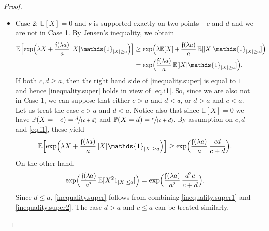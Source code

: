 \documentclass[JEP,XML,SOM,Unicode,published]{cedram}
\newcommand{\spfrac}[2]{\sfrac{#1}{(#2)}}
\theoremstyle{plain}
\theoremstyle{definition}
\newcommand\E{\mathbb{E}}
\newcommand\p{\mathbb{P}}
\begin{document}
\begin{proof}
\begin{itemize}
\item Case 2: $\E[X]=0$ and $\nu$ is supported exactly on two points $-c$ and $d$ and we are not in Case 1. By Jensen's inequality, we obtain
\begin{equation}\label{eq.i1}
\begin{aligned}
\E\Bigl[\exp\Bigl(\lambda X +\frac{\mathfrak{f}(\lambda a)}{ a}\, |X| \mathds{1}_{|X|\geq a}\Bigr)\Bigr] &\geq \exp\Bigl(\lambda \E[X]+ \frac{\mathfrak{f}(\lambda a)}{a}\, \E[|X|\mathds{1}_{|X|\geq a}]\Bigr)\\ &=
\exp\Bigl(\frac{\mathfrak{f}(\lambda a)}{a}\, \E[|X| \mathds{1}_{|X|\geq a}]\Bigr).
\end{aligned}
\end{equation}
If both $c,d\geq a$, then the right hand side of \eqref{inequality.super} is equal to $1$ and hence \eqref{inequality.super} holds in view of \eqref{eq.i1}. So, since we are also not in Case 1, we can suppose that either $c > a$ and $d< a$, or $d > a$ and $c< a$. Let us treat the case $c > a$ and $d < a$. Notice also that since $\E[X]=0$ we have $\p(X=-c)=\spfrac{d}{c+d}$ and $\p(X=d)=\spfrac{c}{c+d}$.
By assumption on $c,d$ and \eqref{eq.i1}, these yield
\begin{equation}\label{inequality.super1}
\E\Bigl[\exp\Bigl(\lambda X +\frac{\mathfrak{f}(\lambda a)}{ a}\, |X| \mathds{1}_{|X|\geq a}\Bigr)\Bigr]
\geq \exp\Bigl(\frac{\mathfrak{f}(\lambda a)}{a}\, \frac{cd}{c+d}\Bigr).\end{equation}
On the other hand,
\begin{equation}\label{inequality.super2}
\exp \Bigl(\frac{\mathfrak{f}(\lambda a)}{a^2}\, \E[X^2 1_{|X|\leq a}]\Bigr)=
\exp\Bigl(\frac{\mathfrak{f}(\lambda a)}{a^2}\, \frac{d^2c}{c+d}\Bigr).\end{equation}
Since $d\leq a$, \eqref{inequality.super} follows from combining \eqref{inequality.super1} and \eqref{inequality.super2}. The case $d>a$ and $c\leq a$ can be treated similarly.


\end{itemize}
\end{proof}
\end{document}
